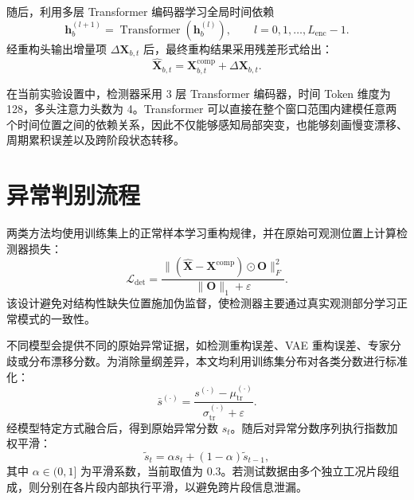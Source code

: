 \documentclass[bachelor, vlined]{DissertUESTC}
\begin{document}
    随后，利用多层 Transformer 编码器学习全局时间依赖
    \begin{equation}
        \mathbf{h}_{b}^{(l+1)} = \operatorname{Transformer}\!\left(\mathbf{h}_{b}^{(l)}\right), \qquad l=0,1,\ldots,L_{\mathrm{enc}}-1.
    \end{equation}
    经重构头输出增量项 $\Delta \mathbf{X}_{b,t}$ 后，最终重构结果采用残差形式给出：
    \begin{equation}
        \hat{\mathbf{X}}_{b,t} = \mathbf{X}_{b,t}^{\mathrm{comp}} + \Delta \mathbf{X}_{b,t}.
    \end{equation}

    在当前实验设置中，检测器采用 3 层 Transformer 编码器，时间 Token 维度为 128，多头注意力头数为 4。Transformer 可以直接在整个窗口范围内建模任意两个时间位置之间的依赖关系，因此不仅能够感知局部突变，也能够刻画慢变漂移、周期累积误差以及跨阶段状态转移。

    \section{异常判别流程}

    两类方法均使用训练集上的正常样本学习重构规律，并在原始可观测位置上计算检测器损失：
    \begin{equation}
        \mathcal{L}_{\mathrm{det}}
        =
        \frac{\|(\hat{\mathbf{X}}-\mathbf{X}^{\mathrm{comp}}) \odot \mathbf{O}\|_F^2}{\|\mathbf{O}\|_1 + \varepsilon}.
    \end{equation}
    该设计避免对结构性缺失位置施加伪监督，使检测器主要通过真实观测部分学习正常模式的一致性。

    不同模型会提供不同的原始异常证据，如检测重构误差、VAE 重构误差、专家分歧或分布漂移分数。为消除量纲差异，本文均利用训练集分布对各类分数进行标准化：
    \begin{equation}
        \bar{s}^{(\cdot)} = \frac{s^{(\cdot)}-\mu^{(\cdot)}_{\mathrm{tr}}}{\sigma^{(\cdot)}_{\mathrm{tr}} + \varepsilon}.
    \end{equation}
    经模型特定方式融合后，得到原始异常分数 $s_t$。随后对异常分数序列执行指数加权平滑：
    \begin{equation}
        \tilde{s}_t = \alpha s_t + (1-\alpha)\tilde{s}_{t-1},
    \end{equation}
    其中 $\alpha \in (0,1]$ 为平滑系数，当前取值为 $0.3$。若测试数据由多个独立工况片段组成，则分别在各片段内部执行平滑，以避免跨片段信息泄漏。
\end{document}
